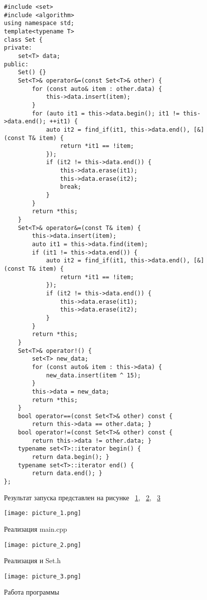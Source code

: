 \documentclass[a4paper, 14pt]{extarticle}
\begin{document}
\begin{figure}[!htb]
\begin{lstlisting}[language={},caption={класс Set.h},label={lst:code3}]
#include <set>
#include <algorithm>
using namespace std;
template<typename T>
class Set {
private:
    set<T> data;
public:
    Set() {}
    Set<T>& operator&=(const Set<T>& other) {
        for (const auto& item : other.data) {
            this->data.insert(item);
        }
        for (auto it1 = this->data.begin(); it1 != this->data.end(); ++it1) {
            auto it2 = find_if(it1, this->data.end(), [&](const T& item) {
                return *it1 == !item;
            });
            if (it2 != this->data.end()) {
                this->data.erase(it1);
                this->data.erase(it2);
                break;
            }
        }
        return *this;
    }
    Set<T>& operator&=(const T& item) {
        this->data.insert(item);
        auto it1 = this->data.find(item);
        if (it1 != this->data.end()) {
            auto it2 = find_if(it1, this->data.end(), [&](const T& item) {
                return *it1 == !item;
            });
            if (it2 != this->data.end()) {
                this->data.erase(it1);
                this->data.erase(it2);
            }
        }
        return *this;
    }
    Set<T>& operator!() {
        set<T> new_data;
        for (const auto& item : this->data) {
            new_data.insert(item ^ 15); 
        }
        this->data = new_data;
        return *this;
    }
    bool operator==(const Set<T>& other) const {
        return this->data == other.data; }
    bool operator!=(const Set<T>& other) const {
        return this->data != other.data; }
    typename set<T>::iterator begin() {
        return data.begin(); }
    typename set<T>::iterator end() {
        return data.end(); }
};
\end{lstlisting}
\end{figure}

\begin{figure}[!htb]
Результат запуска представлен на рисунке ~\ref{fig:picture_1.png}, ~\ref{fig:picture_2.png}, ~\ref{fig:picture_3.png}
\end{figure}

\begin{figure}[!htb]
	\centering
	\texttt{[image: picture\_1.png]}
\caption{Реализация main.cpp}
\label{fig:picture_1.png}
\end{figure}

\begin{figure}[!htb]
	\centering
	\texttt{[image: picture\_2.png]}
\caption{Реализация и Set.h}
\label{fig:picture_2.png}
\end{figure}

\begin{figure}[!htb]
	\centering
	\texttt{[image: picture\_3.png]}
\caption{Работа программы}
\label{fig:picture_3.png}
\end{figure}
\end{document}
